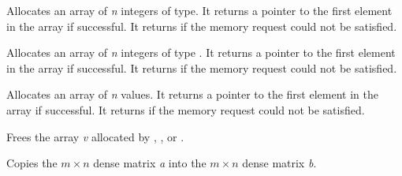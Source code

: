 \documentclass[letterpaper,10pt,english]{sphinxmanual}
\begin{document}

\begin{fulllineitems}
\label{linear_solvers/DLS:c.newLintArray}
Allocates an array of \emph{n} integers of  type.  It
returns a pointer to the first element in the array if
successful. It returns  if the memory request could not be
satisfied.

\end{fulllineitems}


\begin{fulllineitems}
\label{linear_solvers/DLS:c.newIntArray}
Allocates an array of \emph{n} integers of type .  It returns a
pointer to the first element in the array if successful. It returns
 if the memory request could not be satisfied.

\end{fulllineitems}


\begin{fulllineitems}
\label{linear_solvers/DLS:c.newRealArray}
Allocates an array of \emph{n}  values. It returns a pointer
to the first element in the array if successful. It returns
 if the memory request could not be satisfied.

\end{fulllineitems}


\begin{fulllineitems}
\label{linear_solvers/DLS:c.destroyArray}
Frees the array \emph{v} allocated by {\hyperref[linear_solvers/DLS:c.newLintArray]{\emph{}}},
{\hyperref[linear_solvers/DLS:c.newIntArray]{\emph{}}}, or {\hyperref[linear_solvers/DLS:c.newRealArray]{\emph{}}}.

\end{fulllineitems}


\begin{fulllineitems}
\label{linear_solvers/DLS:c.denseCopy}
Copies the \(m \times n\) dense matrix \emph{a} into the \(m
\times n\) dense matrix \emph{b}.

\end{fulllineitems}
\end{document}
